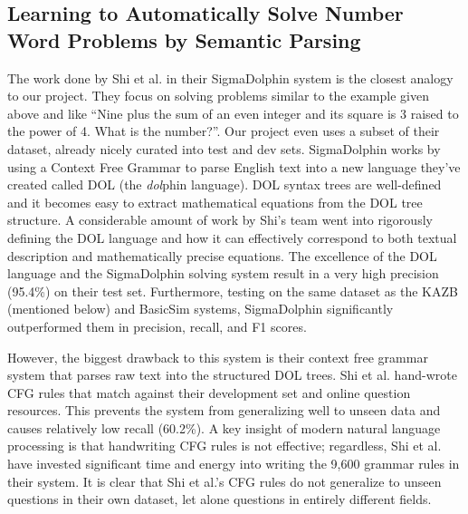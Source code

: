 \documentclass[11pt]{article}
\begin{document}
\subsection{Learning to Automatically Solve Number Word Problems by Semantic Parsing}
The work done by Shi et al. in their SigmaDolphin system is the closest analogy to our project. They focus on solving problems similar to the example given above and like ``Nine plus the sum of an even integer and its square is 3 raised to the power of 4. What is the number?''. Our project even uses a subset of their dataset, already nicely curated into test and dev sets. SigmaDolphin works by using a Context Free Grammar to parse English text into a new language they’ve created called DOL (the \textit{dol}phin language). DOL syntax trees are well-defined and it becomes easy to extract mathematical equations from the DOL tree structure. A considerable amount of work by Shi’s team went into rigorously defining the DOL language and how it can effectively correspond to both textual description and mathematically precise equations. The excellence of the DOL language and the SigmaDolphin solving system result in a very high precision (95.4\%) on their test set. Furthermore, testing on the same dataset as the KAZB (mentioned below) and BasicSim systems, SigmaDolphin significantly outperformed them in precision, recall, and F1 scores.

However, the biggest drawback to this system is their context free grammar system that parses raw text into the structured DOL trees. Shi et al. hand-wrote CFG rules that match against their development set and online question resources. This prevents the system from generalizing well to unseen data and causes relatively low recall (60.2\%). A key insight of modern natural language processing is that handwriting CFG rules is not effective; regardless, Shi et al. have invested significant time and energy into writing the 9,600 grammar rules in their system. It is clear that Shi et al.’s CFG rules do not generalize to unseen questions in their own dataset, let alone questions in entirely different fields.
\end{document}
